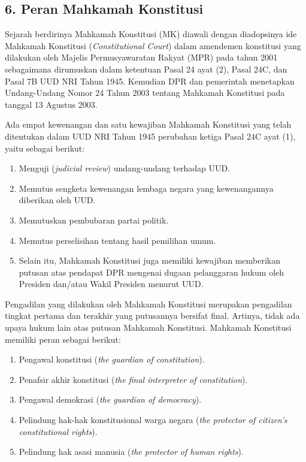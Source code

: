 \subsection{6. Peran Mahkamah Konstitusi}
Sejarah berdirinya Mahkamah Konstitusi (MK) diawali dengan diadopsinya ide Mahkamah Konstitusi (\textit{Constitutional Court}) dalam amendemen konstitusi yang dilakukan oleh Majelis Permusyawaratan Rakyat (MPR) pada tahun 2001 sebagaimana dirumuskan dalam ketentuan Pasal 24 ayat (2), Pasal 24C, dan Pasal 7B UUD NRI Tahun 1945. Kemudian DPR dan pemerintah menetapkan Undang-Undang Nomor 24 Tahun 2003 tentang Mahkamah Konstitusi pada tanggal 13 Agustus 2003.

Ada empat kewenangan dan satu kewajiban Mahkamah Konstitusi yang telah ditentukan dalam UUD NRI Tahun 1945 perubahan ketiga Pasal 24C ayat (1), yaitu sebagai berikut:
\begin{enumerate}
    \item Menguji (\textit{judicial review}) undang-undang terhadap UUD.
    \item Memutus sengketa kewenangan lembaga negara yang kewenangannya diberikan oleh UUD.
    \item Memutuskan pembubaran partai politik.
    \item Memutus perselisihan tentang hasil pemilihan umum.
    \item Selain itu, Mahkamah Konstitusi juga memiliki kewajiban memberikan putusan atas pendapat DPR mengenai dugaan pelanggaran hukum oleh Presiden dan/atau Wakil Presiden menurut UUD.
\end{enumerate}

Pengadilan yang dilakukan oleh Mahkamah Konstitusi merupakan pengadilan tingkat pertama dan terakhir yang putusannya bersifat final. Artinya, tidak ada upaya hukum lain atas putusan Mahkamah Konstitusi. Mahkamah Konstitusi memiliki peran sebagai berikut:
\begin{enumerate}
    \item Pengawal konstitusi (\textit{the guardian of constitution}).
    \item Penafsir akhir konstitusi (\textit{the final interpreter of constitution}).
    \item Pengawal demokrasi (\textit{the guardian of democracy}).
    \item Pelindung hak-hak konstitusional warga negara (\textit{the protector of citizen's constitutional rights}).
    \item Pelindung hak asasi manusia (\textit{the protector of human rights}).
\end{enumerate}


